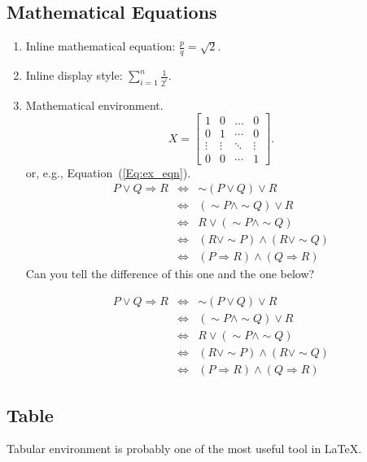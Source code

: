 \documentclass[11pt]{amsart}
\theoremstyle{plain}%
\theoremstyle{definition}
\theoremstyle{remark}
\numberwithin{equation}{section}
\begin{document}
\subsection{Mathematical Equations}
\begin{enumerate}
    \item Inline mathematical equation: $\frac{p}{q} = \sqrt{2}$.
    \item Inline display style: $\displaystyle \sum_{i=1}^n \frac1{2^i}$.
    \item Mathematical environment.
    \[
    X =
    \begin{bmatrix}
    1 & 0& \ldots & 0 \\
    0 & 1 & \cdots & 0 \\
    
    \vdots & \vdots & \ddots & \vdots \\
    0 & 0 & \cdots & 1
    \end{bmatrix}.
    \]
    or, e.g., Equation~(\ref{Eq:ex_eqn}).
\begin{eqnarray}\label{Eq:ex_eqn}
P \vee Q \Rightarrow R  &\Leftrightarrow& \sim (P \vee Q) \vee R\\
&\Leftrightarrow& (\sim P \wedge \sim Q) \vee R\\
&\Leftrightarrow& R \vee (\sim P \wedge \sim Q)\\
&\Leftrightarrow& (R \vee \sim P) \wedge (R \vee \sim Q)\\
&\Leftrightarrow& (P \Rightarrow R) \wedge (Q \Rightarrow R)
\end{eqnarray}
Can you tell the difference of this one and the one below?

\begin{eqnarray*}
P \vee Q \Rightarrow R  &\Leftrightarrow& \sim (P \vee Q) \vee R\\
&\Leftrightarrow& (\sim P \wedge \sim Q) \vee R\\
&\Leftrightarrow& R \vee (\sim P \wedge \sim Q)\\
&\Leftrightarrow& (R \vee \sim P) \wedge (R \vee \sim Q)\\
&\Leftrightarrow& (P \Rightarrow R) \wedge (Q \Rightarrow R)
\end{eqnarray*}


\end{enumerate}

\subsection{Table}
Tabular environment is probably one of the most useful tool in \LaTeX.
\end{document}
